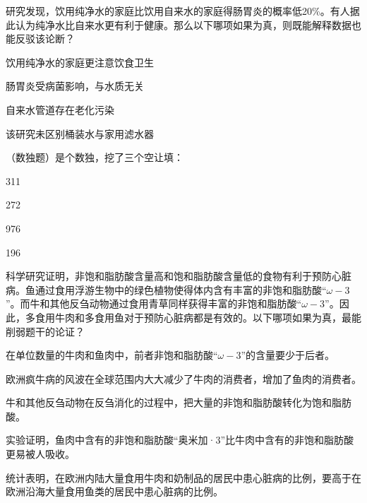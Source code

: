 \documentclass{exam-zh}
\begin{document}
\begin{question}
研究发现，饮用纯净水的家庭比饮用自来水的家庭得肠胃炎的概率低20\%。有人据此认为纯净水比自来水更有利于健康。那么以下哪项如果为真，则既能解释数据也能反驳该论断？ \paren[]
\begin{choices}
  \item 饮用纯净水的家庭更注意饮食卫生
  \item 肠胃炎受病菌影响，与水质无关
  \item 自来水管道存在老化污染
  \item 该研究未区别桶装水与家用滤水器
\end{choices}
\end{question}

\begin{question}
（数独题）是个数独，挖了三个空让填： \paren[]
\begin{choices}
  \item 311
  \item 272
  \item 976
  \item 196
\end{choices}
\end{question}

\begin{question}
科学研究证明，非饱和脂肪酸含量高和饱和脂肪酸含量低的食物有利于预防心脏病。鱼通过食用浮游生物中的绿色植物使得体内含有丰富的非饱和脂肪酸“$\omega-3$”。而牛和其他反刍动物通过食用青草同样获得丰富的非饱和脂肪酸“$\omega-3$”。因此，多食用牛肉和多食用鱼对于预防心脏病都是有效的。以下哪项如果为真，最能削弱题干的论证？ \paren[]
\begin{choices}
  \item 在单位数量的牛肉和鱼肉中，前者非饱和脂肪酸“$\omega-3$”的含量要少于后者。
  \item 欧洲疯牛病的风波在全球范围内大大减少了牛肉的消费者，增加了鱼肉的消费者。
  \item 牛和其他反刍动物在反刍消化的过程中，把大量的非饱和脂肪酸转化为饱和脂肪酸。
  \item 实验证明，鱼肉中含有的非饱和脂肪酸“奥米加·3”比牛肉中含有的非饱和脂肪酸更易被人吸收。
  \item 统计表明，在欧洲内陆大量食用牛肉和奶制品的居民中患心脏病的比例，要高于在欧洲沿海大量食用鱼类的居民中患心脏病的比例。
\end{choices}
\end{question}
\end{document}
